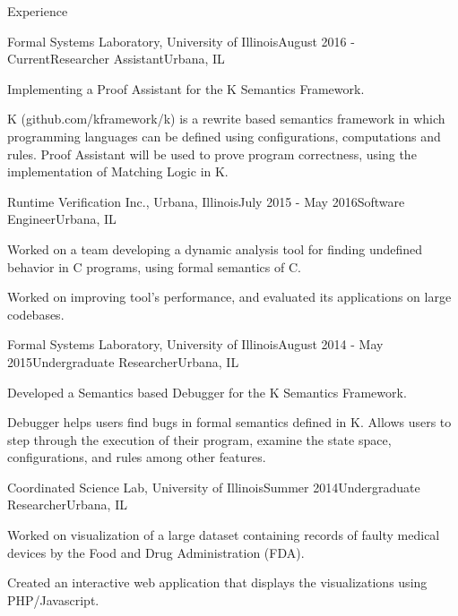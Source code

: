 \documentclass{resume} %
\begin{document}
\begin{rSection}{Experience}

\begin{rSubsection}{Formal Systems Laboratory, University of Illinois}{August 2016 - Current}{Researcher Assistant}{Urbana, IL}
\item Implementing a Proof Assistant for the K Semantics Framework.
\item K (github.com/kframework/k) is a rewrite based semantics framework in which programming
languages can be defined using configurations, computations and rules. Proof Assistant will be used to prove program correctness, using the implementation of Matching Logic in K.
\end{rSubsection}

\begin{rSubsection}{Runtime Verification Inc., Urbana, Illinois}{July 2015 - May 2016}{Software Engineer}{Urbana, IL}
\item Worked on a team developing a dynamic analysis tool for finding undefined behavior in C programs, using formal semantics of C.
\item Worked on improving tool's performance, and evaluated its applications on large codebases.
\end{rSubsection}

\begin{rSubsection}{Formal Systems Laboratory, University of Illinois}{August 2014 - May 2015}{Undergraduate Researcher}{Urbana, IL}
\item Developed a Semantics based Debugger for the K Semantics Framework.
\item Debugger helps users find bugs in formal semantics defined in K. Allows users to step
through the execution of their program, examine the state space, configurations, and rules
among other features.
\end{rSubsection}

\begin{rSubsection}{Coordinated Science Lab, University of Illinois}{Summer 2014}{Undergraduate Researcher}{Urbana, IL}
\item Worked on visualization of a large dataset containing records of faulty medical devices by the Food and Drug Administration (FDA).
\item Created an interactive web application that displays the visualizations using PHP/Javascript.
\end{rSubsection}



\end{rSection}
\end{document}
